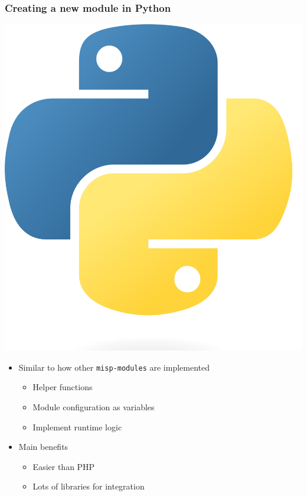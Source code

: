 \begin{frame}
    \frametitle{Creating a new module in Python}
    \begin{center}
        \includegraphics[scale=0.03]{pictures/python-logo.png}
    \end{center}
    \begin{itemize}
        \item Similar to how other \texttt{misp-modules} are implemented
        \begin{itemize}
            \item Helper functions
            \item Module configuration as variables
            \item Implement runtime logic
        \end{itemize}
        \item Main benefits
        \begin{itemize}
            \item Easier than PHP
            \item Lots of libraries for integration
        \end{itemize}
    \end{itemize}
\end{frame}

